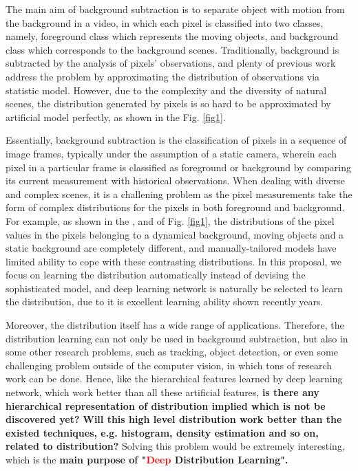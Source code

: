 \documentclass[UTF8]{article}
\newcommand{\reffig}[1]{Fig. \ref{#1}}
\begin{document}
The main aim of background subtraction is to separate object with motion from the background in a video,
in which each pixel is classified into two classes, namely, foreground class which represents the moving objects,
and background class which corresponds to the background scenes.
%
Traditionally,
background is subtracted by the analysis of pixels' observations,
and plenty of previous work address the problem by approximating the distribution of observations via statistic model.
%
However,
due to the complexity and the diversity of natural scenes,
the distribution generated by pixels is so hard to be approximated by artificial model perfectly,
as shown in the \reffig{fig1}.

Essentially, background subtraction is the classification of pixels in a sequence of image frames,
typically under the assumption of a static camera,
wherein each pixel in a particular frame is classified as foreground or background by comparing its current measurement with historical observations.
%
When dealing with diverse and complex scenes,
it is a challening problem as the pixel measurements take the form of complex distributions for the pixels in both foreground and background.
%
For example,
as shown in the ,  and  of \reffig{fig1},
the distributions of the pixel values in the pixels belonging to a dynamical background, moving objects and a static background are completely different,
and manually-tailored models have limited ability to cope with these contrasting distributions.
%
In this proposal,
we focus on learning the distribution automatically instead of devising the sophisticated model,
and deep learning network is naturally be selected to learn the distribution,
due to it is excellent learning ability shown recently years.

Moreover,
the distribution itself has a wide range of applications.
Therefore, the distribution learning can not only be used in background subtraction,
but also in some other research problems, such as tracking, object detection, or even some challenging problem outside of the computer vision,
in which tons of research work can be done.
%
Hence,
like the hierarchical features learned by deep learning network,
which work better than all these artificial features,
\textbf{is there any hierarchical representation of distribution implied which is not be discovered yet?}
%
\textbf{Will this high level distribution work better than the existed techniques, e.g. histogram, density estimation and so on, related to distribution?}
%
Solving this problem would be extremely interesting, which is the \textbf{main purpose of "\textcolor{red}{Deep} Distribution Learning".}
\end{document}
